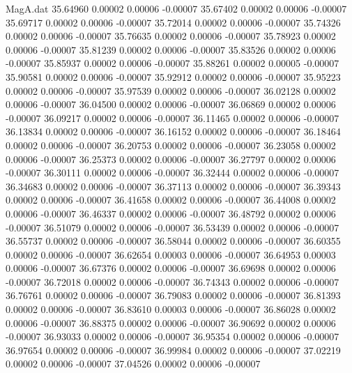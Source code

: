\begin{filecontents}{MagA.dat}
  35.64960    0.00002    0.00006   -0.00007
  35.67402    0.00002    0.00006   -0.00007
  35.69717    0.00002    0.00006   -0.00007
  35.72014    0.00002    0.00006   -0.00007
  35.74326    0.00002    0.00006   -0.00007
  35.76635    0.00002    0.00006   -0.00007
  35.78923    0.00002    0.00006   -0.00007
  35.81239    0.00002    0.00006   -0.00007
  35.83526    0.00002    0.00006   -0.00007
  35.85937    0.00002    0.00006   -0.00007
  35.88261    0.00002    0.00005   -0.00007
  35.90581    0.00002    0.00006   -0.00007
  35.92912    0.00002    0.00006   -0.00007
  35.95223    0.00002    0.00006   -0.00007
  35.97539    0.00002    0.00006   -0.00007
  36.02128    0.00002    0.00006   -0.00007
  36.04500    0.00002    0.00006   -0.00007
  36.06869    0.00002    0.00006   -0.00007
  36.09217    0.00002    0.00006   -0.00007
  36.11465    0.00002    0.00006   -0.00007
  36.13834    0.00002    0.00006   -0.00007
  36.16152    0.00002    0.00006   -0.00007
  36.18464    0.00002    0.00006   -0.00007
  36.20753    0.00002    0.00006   -0.00007
  36.23058    0.00002    0.00006   -0.00007
  36.25373    0.00002    0.00006   -0.00007
  36.27797    0.00002    0.00006   -0.00007
  36.30111    0.00002    0.00006   -0.00007
  36.32444    0.00002    0.00006   -0.00007
  36.34683    0.00002    0.00006   -0.00007
  36.37113    0.00002    0.00006   -0.00007
  36.39343    0.00002    0.00006   -0.00007
  36.41658    0.00002    0.00006   -0.00007
  36.44008    0.00002    0.00006   -0.00007
  36.46337    0.00002    0.00006   -0.00007
  36.48792    0.00002    0.00006   -0.00007
  36.51079    0.00002    0.00006   -0.00007
  36.53439    0.00002    0.00006   -0.00007
  36.55737    0.00002    0.00006   -0.00007
  36.58044    0.00002    0.00006   -0.00007
  36.60355    0.00002    0.00006   -0.00007
  36.62654    0.00003    0.00006   -0.00007
  36.64953    0.00003    0.00006   -0.00007
  36.67376    0.00002    0.00006   -0.00007
  36.69698    0.00002    0.00006   -0.00007
  36.72018    0.00002    0.00006   -0.00007
  36.74343    0.00002    0.00006   -0.00007
  36.76761    0.00002    0.00006   -0.00007
  36.79083    0.00002    0.00006   -0.00007
  36.81393    0.00002    0.00006   -0.00007
  36.83610    0.00003    0.00006   -0.00007
  36.86028    0.00002    0.00006   -0.00007
  36.88375    0.00002    0.00006   -0.00007
  36.90692    0.00002    0.00006   -0.00007
  36.93033    0.00002    0.00006   -0.00007
  36.95354    0.00002    0.00006   -0.00007
  36.97654    0.00002    0.00006   -0.00007
  36.99984    0.00002    0.00006   -0.00007
  37.02219    0.00002    0.00006   -0.00007
  37.04526    0.00002    0.00006   -0.00007

\end{filecontents}
